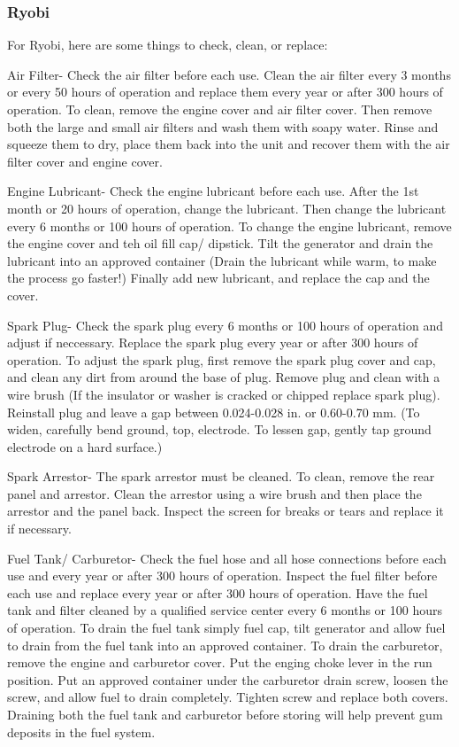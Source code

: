 \documentclass[12pt]{../SOP3_beta}
\begin{document}
\subsubsection{Ryobi}
\NP For Ryobi, here are some things to check, clean, or replace:

\NP Air Filter- Check the air filter before each use. Clean the air filter every 3 months or every 50 hours of operation and replace them every year or after 300 hours of operation. To clean, remove the engine cover and air filter cover. Then remove both the large and small air filters and wash them with soapy water. Rinse and squeeze them to dry, place them back into the unit and recover them with the air filter cover and engine cover. 

\NP Engine Lubricant- Check the engine lubricant before each use. After the 1st month or 20 hours of operation, change the lubricant. Then change the lubricant every 6 months or 100 hours of operation. To change the engine lubricant, remove the engine cover and teh oil fill cap/ dipstick. Tilt the generator and drain the lubricant into an approved container (Drain the lubricant while warm, to make the process go faster!) Finally add new lubricant, and replace the cap and the cover. 

\NP Spark Plug- Check the spark plug every 6 months or 100 hours of operation and adjust if neccessary. Replace the spark plug every year or after 300 hours of operation. To adjust the spark plug, first remove the spark plug cover and cap, and clean any dirt from around the base of plug. Remove plug and clean with a wire brush (If the insulator or washer is cracked or chipped replace spark plug). Reinstall plug and leave a gap between 0.024-0.028 in. or 0.60-0.70 mm. (To widen, carefully bend ground, top, electrode. To lessen gap, gently tap ground electrode on a hard surface.) 

\NP Spark Arrestor- The spark arrestor must be cleaned. To clean, remove the rear panel and arrestor. Clean the arrestor using a wire brush and then place the arrestor and the panel back. Inspect the screen for breaks or tears and replace it if necessary.

\NP Fuel Tank/ Carburetor- Check the fuel hose and all hose connections before each use and every year or after 300 hours of operation. Inspect the fuel filter before each use and replace every year or after 300 hours of operation. Have the fuel tank and filter cleaned by a qualified service center every 6 months or 100 hours of operation. To drain the fuel tank simply fuel cap, tilt generator and allow fuel to drain from the fuel tank into an approved container. To drain the carburetor, remove the engine and carburetor cover. Put the enging choke lever in the run position. Put an approved container under the carburetor drain screw, loosen the screw, and allow fuel to drain completely. Tighten screw and replace both covers. Draining both the fuel tank and carburetor before storing will help prevent gum deposits in the fuel system.
\end{document}
